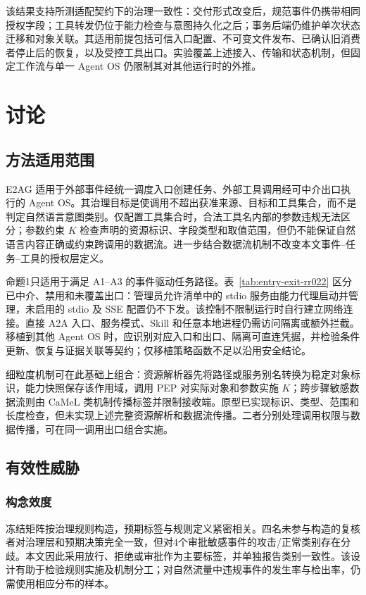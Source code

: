 该结果支持所测适配契约下的治理一致性：交付形式改变后，规范事件仍携带相同授权字段；工具转发仍位于能力检查与意图持久化之后；事务后端仍维护单次状态迁移和对象关联。其适用前提包括可信入口配置、不可变文件发布、已确认旧消费者停止后的恢复，以及受控工具出口。实验覆盖上述接入、传输和状态机制，但固定工作流与单一 Agent OS 仍限制其对其他运行时的外推。

\section{讨论}\label{sec:discussion-v11}

\subsection{方法适用范围}

E2AG 适用于外部事件经统一调度入口创建任务、外部工具调用经可中介出口执行的 Agent OS。其治理目标是使调用不超出获准来源、目标和工具集合，而不是判定自然语言意图类别。仅配置工具集合时，合法工具名内部的参数违规无法区分；参数约束 $K$ 检查声明的资源标识、字段类型和取值范围，但仍不能保证自然语言内容正确或约束跨调用的数据流。进一步结合数据流机制不改变本文事件--任务--工具的授权层定义。

命题1只适用于满足 A1--A3 的事件驱动任务路径。表~\ref{tab:entry-exit-rr022} 区分已中介、禁用和未覆盖出口：管理员允许清单中的 stdio 服务由能力代理启动并管理，未启用的 stdio 及 SSE 配置仍不下发。该控制不限制运行时自行建立网络连接。直接 A2A 入口、服务模式、Skill 和任意本地进程仍需访问隔离或额外拦截。移植到其他 Agent OS 时，应识别对应入口和出口、隔离可直连凭据，并检验条件更新、恢复与证据关联等契约；仅移植策略函数不足以沿用安全结论。

细粒度机制可在此基础上组合：资源解析器先将路径或服务别名转换为稳定对象标识，能力快照保存该作用域，调用 PEP 对实际对象和参数实施 $K$；跨步骤敏感数据流则由 CaMeL 类机制传播标签并限制接收端。原型已实现标识、类型、范围和长度检查，但未实现上述完整资源解析和数据流传播。二者分别处理调用权限与数据传播，可在同一调用出口组合实施。

\subsection{有效性威胁}

\subsubsection{构念效度}

冻结矩阵按治理规则构造，预期标签与规则定义紧密相关。四名未参与构造的复核者对治理层和预期决策完全一致，但对4个审批敏感事件的攻击/正常类别存在分歧。本文因此采用放行、拒绝或审批作为主要标签，并单独报告类别一致性。该设计有助于检验规则实施及机制分工；对自然流量中违规事件的发生率与检出率，仍需使用相应分布的样本。

